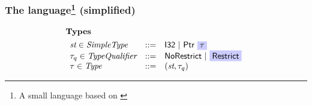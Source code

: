 \begin{frame}
\frametitle{The language\footnote{A small language based on \cite{blazy2009mechanized}} (simplified)}
\begin{figure}
\[%
\begin{array}{lrl}
\multicolumn{3}{l}{\hspace{-5pt}\textbf{Types}} \\[4pt]
\textdom{st} \in \Simpletype                    & \bnfdef   & \Inttype \ | \ \mathsf{Ptr} \ \colorbox{blue!20}{$\tau$}  \\
    \tau_q \in \Typequalifier                   & \bnfdef   & \Noqualifier \ | \ \colorbox{blue!20}{\Restrictqualifier} \\
    \tau \in \Type                              & \bnfdef   & (\textdom{st}, \tau_q) %
\end{array}
\]
\end{figure}

\end{frame}